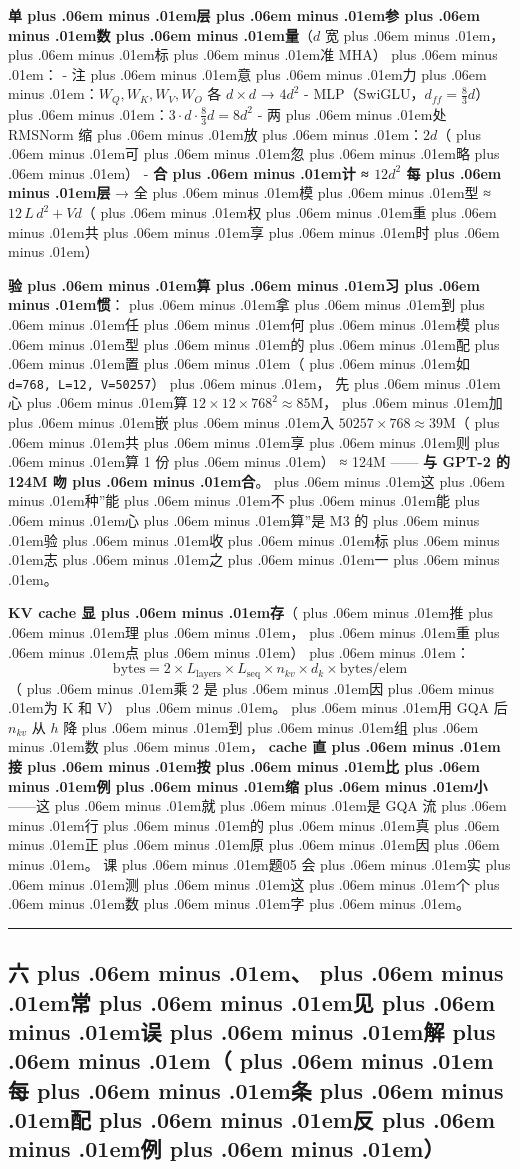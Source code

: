 \documentclass[
]{article}
\newcommand{\passthrough}[1]{#1}
\def\zh#1{{\zhfont #1}}
\def\sym#1{{\symfont #1}}
\def\zhglue{\hskip0pt plus .06em minus .01em}
\begin{document}
\textbf{\zh{单\zhglue 层\zhglue 参\zhglue 数\zhglue 量}}\zh{（}\(d\) \zh{宽\zhglue ，\zhglue 标\zhglue 准} MHA\zh{）\zhglue ：} - \zh{注\zhglue 意\zhglue 力\zhglue ：}\(W_Q,W_K,W_V,W_O\) \zh{各} \(d\times d\) \sym{→} \(4d^2\) - MLP\zh{（}SwiGLU\zh{，}\(d_{ff}=\tfrac{8}{3}d\)\zh{）\zhglue ：}\(3\cdot d\cdot \tfrac{8}{3}d = 8d^2\) - \zh{两\zhglue 处} RMSNorm \zh{缩\zhglue 放\zhglue ：}\(2d\)\zh{（\zhglue 可\zhglue 忽\zhglue 略\zhglue ）} - \textbf{\zh{合\zhglue 计} \sym{≈} \(12d^2\) \zh{每\zhglue 层}} \sym{→} \zh{全\zhglue 模\zhglue 型} \sym{≈} \(12\,L\,d^2 + Vd\)\zh{（\zhglue 权\zhglue 重\zhglue 共\zhglue 享\zhglue 时\zhglue ）}

\textbf{\zh{验\zhglue 算\zhglue 习\zhglue 惯}}\zh{：\zhglue 拿\zhglue 到\zhglue 任\zhglue 何\zhglue 模\zhglue 型\zhglue 的\zhglue 配\zhglue 置\zhglue （\zhglue 如} \passthrough{\lstinline!d=768, L=12, V=50257!}\zh{）\zhglue ，} \zh{先\zhglue 心\zhglue 算} \(12\times12\times768^2 \approx 85\text{M}\)\zh{，\zhglue 加\zhglue 嵌\zhglue 入} \(50257\times768\approx39\text{M}\)\zh{（\zhglue 共\zhglue 享\zhglue 则\zhglue 算} 1 \zh{份\zhglue ）} \sym{≈} 124M ------ \textbf{\zh{与} GPT-2 \zh{的} 124M \zh{吻\zhglue 合}}\zh{。\zhglue 这\zhglue 种}''\zh{能\zhglue 不\zhglue 能\zhglue 心\zhglue 算}''\zh{是} M3 \zh{的\zhglue 验\zhglue 收\zhglue 标\zhglue 志\zhglue 之\zhglue 一\zhglue 。}

\textbf{KV cache \zh{显\zhglue 存}}\zh{（\zhglue 推\zhglue 理\zhglue ，\zhglue 重\zhglue 点\zhglue ）\zhglue ：} \[\text{bytes} = 2 \times L_{\text{layers}} \times L_{\text{seq}} \times n_{kv} \times d_k \times \text{bytes/elem}\] \zh{（\zhglue 乘} 2 \zh{是\zhglue 因\zhglue 为} K \zh{和} V\zh{）\zhglue 。\zhglue 用} GQA \zh{后} \(n_{kv}\) \zh{从} \(h\) \zh{降\zhglue 到\zhglue 组\zhglue 数\zhglue ，} \textbf{cache \zh{直\zhglue 接\zhglue 按\zhglue 比\zhglue 例\zhglue 缩\zhglue 小}}------\zh{这\zhglue 就\zhglue 是} GQA \zh{流\zhglue 行\zhglue 的\zhglue 真\zhglue 正\zhglue 原\zhglue 因\zhglue 。} \zh{课\zhglue 题}05 \zh{会\zhglue 实\zhglue 测\zhglue 这\zhglue 个\zhglue 数\zhglue 字\zhglue 。}

\begin{center}\rule{0.5\linewidth}{0.5pt}\end{center}

\subsection{\zh{六\zhglue 、\zhglue 常\zhglue 见\zhglue 误\zhglue 解\zhglue （\zhglue 每\zhglue 条\zhglue 配\zhglue 反\zhglue 例\zhglue ）}}\label{ux516dux5e38ux89c1ux8befux89e3ux6bcfux6761ux914dux53cdux4f8b}
\end{document}
